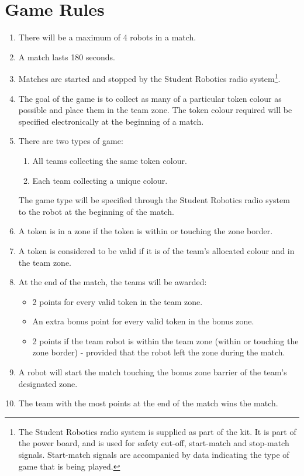 \section {Game Rules}
\label{game-rules}

\begin{enumerate}
\item There will be a maximum of 4 robots in a match.
\item A match lasts 180 seconds.
\item Matches are started and stopped by the Student Robotics radio system\footnote{The Student Robotics radio system is supplied as part of the kit.  It is part of the power board, and is used for safety cut-off, start-match and stop-match signals.  Start-match signals are accompanied by data indicating the type of game that is being played.}.
\item The goal of the game is to collect as many of a particular token colour as possible and place them in the team zone.  The token colour required will be specified electronically at the beginning of a match.
\item There are two types of game:
  \renewcommand{\labelenumii}{\arabic{enumii}.}
  \begin{enumerate}
  \item All teams collecting the same token colour.
  \item Each team collecting a unique colour. 
  \end{enumerate}
The game type will be specified through the Student Robotics radio system to the robot at the beginning of the match.
\item A token is in a zone if the token is within or touching the zone border.
\item A token is considered to be valid if it is of the team's allocated colour and in the team zone.
\item At the end of the match, the teams will be awarded:
  \begin{itemize}
  \item 2 points for every valid token in the team zone.
  \item An extra bonus point for every valid token in the bonus zone.
  \item 2 points if the team robot is within the team zone (within or touching the zone border) - provided that the robot left the zone during the match.
  \end{itemize}
\item A robot will start the match touching the bonus zone barrier of the team's designated zone.
\item The team with the most points at the end of the match wins the match.
\end{enumerate}

